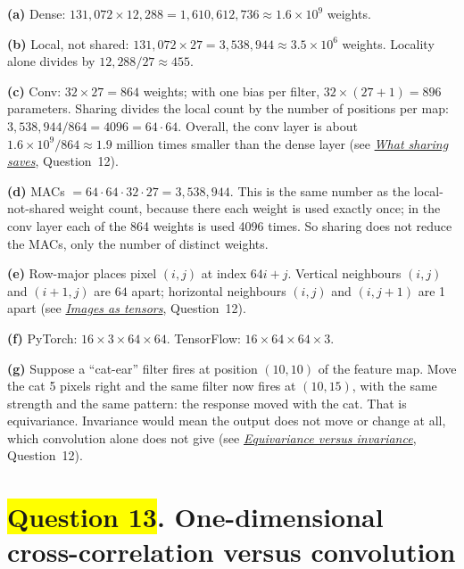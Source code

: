 \documentclass[12pt,a4paper]{article}
\newcommand{\seeconcept}[3]{(see \hyperref[#1]{\textit{#2}}, Question~#3)}
\newcommand{\hlq}[1]{{\setlength{\fboxsep}{1.5pt}\colorbox{yellow}{#1}}}
\begin{document}
\textbf{(a)} Dense: $131{,}072\times12{,}288=1{,}610{,}612{,}736\approx1.6\times10^9$ weights.

\textbf{(b)} Local, not shared: $131{,}072\times27=3{,}538{,}944\approx3.5\times10^6$ weights. Locality alone divides by $12{,}288/27\approx455$.

\textbf{(c)} Conv: $32\times27=864$ weights; with one bias per filter, $32\times(27+1)=896$ parameters. Sharing divides the local count by the number of positions per map: $3{,}538{,}944/864=4096=64\cdot64$. Overall, the conv layer is about $1.6\times10^9/864\approx1.9$ million times smaller than the dense layer \seeconcept{c:sharing}{What sharing saves}{12}.

\textbf{(d)} MACs $=64\cdot64\cdot32\cdot27=3{,}538{,}944$. This is the same number as the local-not-shared weight count, because there each weight is used exactly once; in the conv layer each of the 864 weights is used 4096 times. So sharing does not reduce the MACs, only the number of distinct weights.

\textbf{(e)} Row-major places pixel $(i,j)$ at index $64i+j$. Vertical neighbours $(i,j)$ and $(i+1,j)$ are $64$ apart; horizontal neighbours $(i,j)$ and $(i,j+1)$ are 1 apart \seeconcept{c:imgtensor}{Images as tensors}{12}.

\textbf{(f)} PyTorch: $16\times3\times64\times64$. TensorFlow: $16\times64\times64\times3$.

\textbf{(g)} Suppose a ``cat-ear'' filter fires at position $(10,10)$ of the feature map. Move the cat 5 pixels right and the same filter now fires at $(10,15)$, with the same strength and the same pattern: the response moved with the cat. That is equivariance. Invariance would mean the output does not move or change at all, which convolution alone does not give \seeconcept{c:equivariance}{Equivariance versus invariance}{12}.

\section[Question 13. One-dimensional cross-correlation versus convolution]{\hlq{Question 13}. One-dimensional cross-correlation versus convolution}
\end{document}
